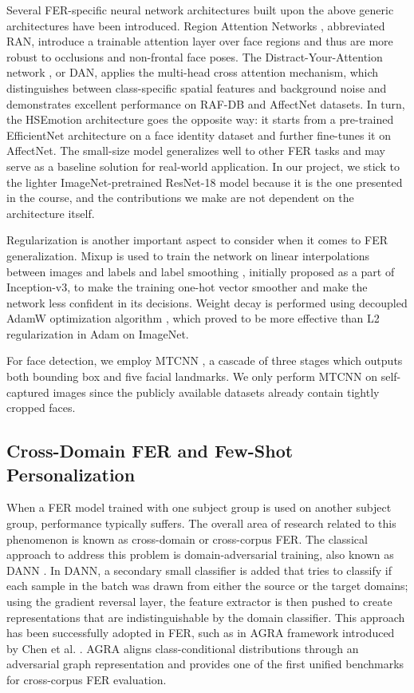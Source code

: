 \documentclass[12pt,a4paper]{article}
\begin{document}
Several FER-specific neural network architectures built upon the above
generic architectures have been introduced. Region Attention Networks
\autocite{wang2020ran}, abbreviated RAN, introduce a trainable
attention layer over face regions and thus are more robust to occlusions
and non-frontal face poses. The Distract-Your-Attention
network \autocite{wen2023dan}, or DAN, applies the multi-head cross
attention mechanism, which distinguishes between class-specific spatial
features and background noise and demonstrates excellent performance
on RAF-DB and AffectNet datasets. In turn, the HSEmotion architecture
\autocite{savchenko2022hsemotion} goes the opposite way: it starts from
a pre-trained EfficientNet architecture on a face identity dataset and
further fine-tunes it on AffectNet. The small-size model generalizes
well to other FER tasks and may serve as a baseline solution for real-world
application. In our project, we stick to the lighter
ImageNet-pretrained ResNet-18 model because it is the one presented
in the course, and the contributions we make are not dependent on the
architecture itself.

Regularization is another important aspect to consider when it comes to FER generalization.
Mixup \autocite{zhang2018mixup} is used to train the
network on linear interpolations between images and labels and
label smoothing \autocite{szegedy2016rethinking}, initially proposed
as a part of Inception-v3, to make the training one-hot vector smoother
and make the network less confident in its decisions. Weight decay is performed using decoupled AdamW optimization algorithm \autocite{loshchilov2019adamw},
which proved to be more effective than L2 regularization in Adam on ImageNet.

For face detection, we employ MTCNN \autocite{zhang2016mtcnn}, a cascade of three stages which outputs both bounding box and five facial landmarks. We only perform MTCNN on self-captured images since the publicly available datasets already contain tightly cropped faces.

\subsection{Cross-Domain FER and Few-Shot Personalization}
\label{sec:litrev:crossdomain}

When a FER model trained with one subject group is used on
another subject group, performance typically suffers. The overall
area of research related to this phenomenon is known as cross-domain
or cross-corpus FER. The classical approach to address this
problem is domain-adversarial training, also known as DANN
\autocite{ganin2015dann}. In DANN, a secondary small classifier
is added that tries to classify if each sample in the batch was
drawn from either the source or the target domains; using the
gradient reversal layer, the feature extractor is then pushed
to create representations that are indistinguishable by the domain
classifier. This approach has been successfully adopted in FER,
such as in AGRA framework introduced by Chen et al.
\autocite{chen2021agra}. AGRA aligns
class-conditional distributions through an adversarial graph
representation and provides one of the first unified
benchmarks for cross-corpus FER evaluation.
\end{document}
